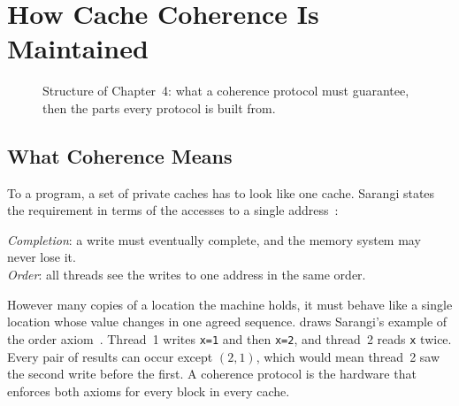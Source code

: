 \chapter{How Cache Coherence Is Maintained}
\label{ch:coherence-basics}

\begin{figure}[htbp]
\centering
{}
\caption[]{Structure of Chapter~4: what a coherence
protocol must guarantee, then the parts every protocol is built from.}
\label{fig:ch4-map}
\end{figure}

\section{What Coherence Means}
\label{sec:coh-meaning}
\label{sec:coh-order}
\label{sec:coh-consistency}
%

To a program, a set of private caches has to look like one cache. Sarangi states
the requirement in terms of the accesses to a single
address~\cite[\S12.4.2, Def.~122]{sarangi2025basic}:

\begin{keybox}
\emph{Completion}: a write must eventually complete, and the memory system may
never lose it.\\[3pt]
\emph{Order}: all threads see the writes to one address in the same order.
\end{keybox}

However many copies of a location the machine holds, it must behave like a single
location whose value changes in one agreed sequence. 
draws Sarangi's example of the order axiom~\cite[\S12.4.2, Ex.~151]{sarangi2025basic}.
Thread~1 writes \texttt{x=1} and then \texttt{x=2}, and thread~2 reads \texttt{x}
twice. Every pair of results can occur except $(2,1)$, which would mean thread~2
saw the second write before the first. A coherence protocol is the hardware that
enforces both axioms for every block in every cache.

